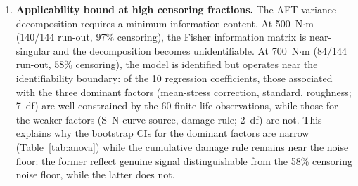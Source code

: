 \documentclass[twocolumn,12pt,a4paper]{article}
\begin{document}
\begin{enumerate}
        As a supplementary check, a hypothetical Basquin-only analysis
        (removing the fatigue strength criterion and classifying run-out
        solely by threshold) was also performed. In this scenario the
        censoring rate varies from 58.3\% (threshold $10^6$) to 45.8\%
        ($3\times10^6$), 40.3\% ($5\times10^6$), and 0\% (no threshold,
        all 144 entries observed), and the variance fractions shift
        modestly (mean-stress 18.0$\rightarrow$32.6\%, standard
        54.9$\rightarrow$45.9\%, roughness 23.3$\rightarrow$19.7\%,
        S--N curve 2.6$\rightarrow$0.3\%). The standard choice remains
        dominant in every case (Std $>$ Rz $>$ MS for all finite
        thresholds; Std $>$ MS $>$ Rz without a threshold), so the
        conclusions are not an artifact of the run-out definition.

  \item \textbf{Applicability bound at high censoring fractions.} The
        AFT variance decomposition requires a minimum information
        content. At 500~N$\cdot$m (140/144 run-out, 97\% censoring),
        the Fisher information matrix is near-singular and the
        decomposition becomes unidentifiable. At 700~N$\cdot$m
        (84/144 run-out, 58\% censoring), the model is identified but
        operates near the identifiability boundary: of the 10
        regression coefficients, those associated with the three
        dominant factors (mean-stress correction, standard, roughness;
        7~df) are well constrained by the 60 finite-life observations,
        while those for the weaker factors (S--N curve source, damage
        rule; 2~df) are not. This explains why the bootstrap CIs for
        the dominant factors are narrow (Table~\ref{tab:anova}) while
        the cumulative damage rule remains near the noise floor: the
        former reflect genuine signal distinguishable from the 58\%
        censoring noise floor, while the latter does not.


\end{enumerate}
\end{document}
